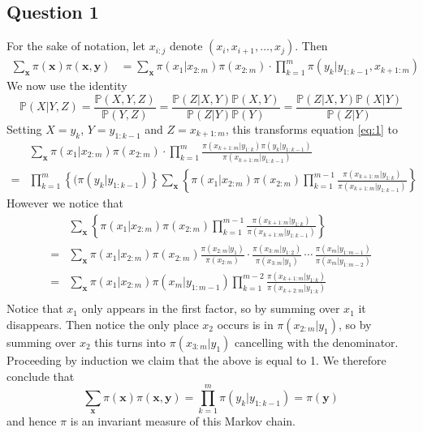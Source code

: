 \documentclass[10pt,a4paper,notitlepage]{article}
\newcommand{\p}{\mathbb{P}}
\newcommand{\x}{\mathbf{x}}
\newcommand{\y}{\mathbf{y}}
\begin{document}
\subsection*{\centering Question 1}
For the sake of notation, let $x_{i:j}$ denote $(x_{i},x_{i+1},\hdots,x_{j})$. Then
\begin{equation}
\begin{aligned}\label{eq:1}
\sum_{\x}\pi(\x)\pi(\x,\y) &= \sum_{\x}\pi(x_{1}|x_{2:m})\pi(x_{2:m})\cdot \prod_{k=1}^{m}\pi(y_{k}|y_{1:k-1},x_{k+1:m})
\end{aligned}
\end{equation}
We now use the identity
\begin{equation}\label{eq:2}
\p(X|Y,Z)=\frac{\p(X,Y,Z)}{\p(Y,Z)}=\frac{\p(Z|X,Y)\p(X,Y)}{\p(Z|Y)\p(Y)}=\frac{\p(Z|X,Y)\p(X|Y)}{\p(Z|Y)}
\end{equation}
Setting $X=y_{k}$, $Y=y_{1:k-1}$ and $Z=x_{k+1:m}$, this transforms equation \eqref{eq:1} to
\begin{equation}
\begin{aligned}
&\sum_{\x}\pi(x_{1}|x_{2:m})\pi(x_{2:m})\cdot \prod_{k=1}^{m}\frac{\pi(x_{k+1:m}|y_{1:k})\pi(y_{k}|y_{1:k-1})}{\pi(x_{k+1:m}|y_{1:k-1})}\\
= &\prod_{k=1}^{m}\left\{(\pi(y_{k}|y_{1:k-1})\right\}\sum_{\x}\left\{\pi(x_{1}|x_{2:m})\pi(x_{2:m})\prod_{k=1}^{m-1}\frac{\pi(x_{k+1:m}|y_{1:k})}{\pi(x_{k+1:m}|y_{1:k-1})}\right\}
\end{aligned}
\end{equation}
However we notice that
\begin{equation}
\begin{aligned}
&\sum_{\x}\left\{\pi(x_{1}|x_{2:m})\pi(x_{2:m})\prod_{k=1}^{m-1}\frac{\pi(x_{k+1:m}|y_{1:k})}{\pi(x_{k+1:m}|y_{1:k-1})}\right\}\\ 
= &\sum_{\x}\pi(x_{1}|x_{2:m})\pi(x_{2:m})\frac{\pi(x_{2:m}|y_{1})}{\pi(x_{2:m})}\cdot \frac{\pi(x_{3:m}|y_{1:2})}{\pi(x_{3:m}|y_{1})}\, \cdots\, \frac{\pi(x_{m}|y_{1:m-1})}{\pi(x_{m}|y_{1:m-2})}\\
= &\sum_{\x}\pi(x_{1}|x_{2:m})\pi(x_{m}|y_{1:m-1})\prod_{k=1}^{m-2}\frac{\pi(x_{k+1:m}|y_{1:k})}{\pi(x_{k+2:m}|y_{1:k})}\\
\end{aligned}
\end{equation}
Notice that $x_{1}$ only appears in the first factor, so by summing over $x_{1}$ it disappears. Then notice the only place $x_{2}$ occurs is in $\pi(x_{2:m}|y_{1})$, so by summing over $x_{2}$ this turns into $\pi(x_{3:m}|y_{1})$ cancelling with the denominator. Proceeding by induction we claim that the above is equal to 1. We therefore conclude that
\begin{equation}
\sum_{\x}\pi(\x)\pi(\x,\y)=\prod_{k=1}^{m}\pi(y_{k}|y_{1:k-1})=\pi(\y)
\end{equation}
and hence $\pi$ is an invariant measure of this Markov chain.
\end{document}
